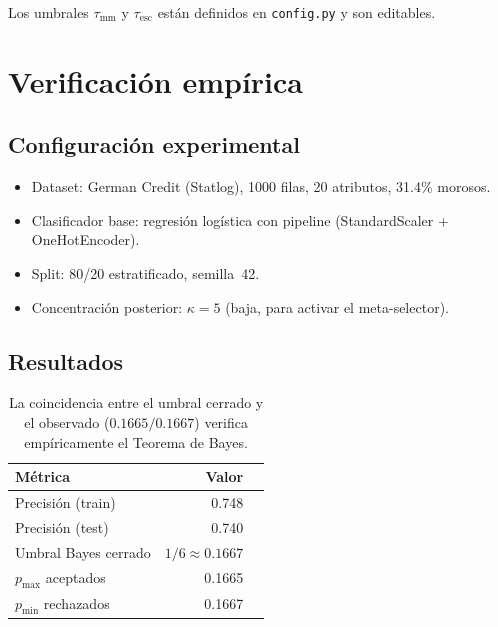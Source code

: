 \documentclass[11pt,a4paper]{article}
\theoremstyle{definition}
\begin{document}
Los umbrales $\tau_{\text{mm}}$ y $\tau_{\text{esc}}$ están definidos en
\texttt{config.py} y son editables.

\section{Verificación empírica}

\subsection*{Configuración experimental}

\begin{itemize}
	\item Dataset: German Credit (Statlog), 1000 filas, 20 atributos, 31.4\% morosos.
	\item Clasificador base: regresión logística con pipeline
	      (StandardScaler + OneHotEncoder).
	\item Split: 80/20 estratificado, semilla~42.
	\item Concentración posterior: $\kappa = 5$ (baja, para activar el meta-selector).
\end{itemize}

\subsection*{Resultados}

\begin{table}[h]
	\centering
	\begin{tabular}{lrc}
		\toprule
		\textbf{Métrica}      & \textbf{Valor}       \\ \midrule
		Precisión (train)     & 0.748                \\
		Precisión (test)      & 0.740                \\
		Umbral Bayes cerrado  & $1/6 \approx 0.1667$ \\
		$p_{\max}$ aceptados  & 0.1665               \\
		$p_{\min}$ rechazados & 0.1667               \\ \bottomrule
	\end{tabular}
	\caption{La coincidencia entre el umbral cerrado y el observado
		($0.1665/0.1667$) verifica empíricamente el Teorema de Bayes.}
	\label{tab:threshold}
\end{table}
\end{document}
